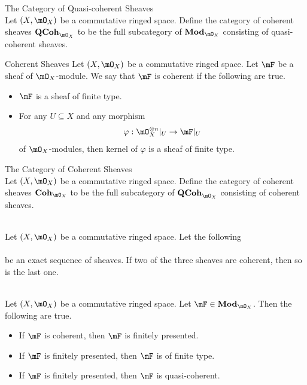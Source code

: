 \documentclass[a4paper]{article}
\begin{document}
\begin{defn}{The Category of Quasi-coherent Sheaves}{}\\
Let $(X,\mO_X)$ be a commutative ringed space. Define the category of coherent sheaves $\bold{QCoh}_{\mO_X}$ to be the full subcategory of $\bold{Mod}_{\mO_X}$ consisting of quasi-coherent sheaves. 
\end{defn}

\begin{defn}{Coherent Sheaves}{} Let $(X,\mO_X)$ be a commutative ringed space. Let $\mF$ be a sheaf of $\mO_X$-module. We say that $\mF$ is coherent if the following are true. 
\begin{itemize}
\item $\mF$ is a sheaf of finite type. 
\item For any $U\subseteq X$ and any morphism $$\varphi:\mO_X^{\otimes n}|_U\to\mF|_U$$ of $\mO_X$-modules, then kernel of $\varphi$ is a sheaf of finite type. 
\end{itemize}
\end{defn}

\begin{defn}{The Category of Coherent Sheaves}{}\\
Let $(X,\mO_X)$ be a commutative ringed space. Define the category of coherent sheaves $\bold{Coh}_{\mO_X}$ to be the full subcategory of $\bold{QCoh}_{\mO_X}$ consisting of coherent sheaves. 
\end{defn}

\begin{prp}{}{}\\
Let $(X,\mO_X)$ be a commutative ringed space. Let the following \\
\\
be an exact sequence of sheaves. If two of the three sheaves are coherent, then so is the last one. 
\end{prp}

\begin{prp}{}{}\\
Let $(X,\mO_X)$ be a commutative ringed space. Let $\mF\in\bold{Mod}_{\mO_X}$. Then the following are true. 
\begin{itemize}
\item If $\mF$ is coherent, then $\mF$ is finitely presented. 
\item If $\mF$ is finitely presented, then $\mF$ is of finite type. 
\item If $\mF$ is finitely presented, then $\mF$ is quasi-coherent. 
\end{itemize}
\end{prp}
\end{document}
